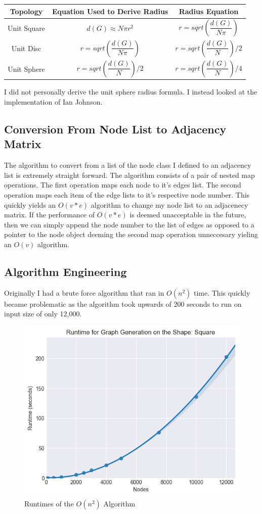 \documentclass{article}
\begin{document}
		\begin{tabular}{ |c|c|c| }
				\hline
				Topology & Equation Used to Derive Radius & Radius Equation \\
				\hline
				Unit Square & $d(G) \approx N\pi r^2 $ & $r = sqrt(\dfrac{d(G)}{N\pi})$ \\
				\hline
				Unit Disc & $r = sqrt(\dfrac{d(G)}{N\pi})$ & $r = sqrt(\dfrac{d(G)}{N})/2$ \\
				\hline
				Unit Sphere & $r = sqrt(\dfrac{d(G)}{N})/2$ & $r = sqrt(\dfrac{d(G)}{N})/4$ \\
				\hline
		\end{tabular}
    I did not personally derive the unit sphere radius formula.
    I instead looked at the implementation of Ian Johnson\cite{ianjjohnson}.
	\subsection{Conversion From Node List to Adjacency Matrix}
		The algorithm to convert from a list of the node class I defined to an adjacency list is extremely straight forward.
		The algorithm consists of a pair of nested map operations.
		The first operation maps each node to it's edges list.
		The second operation maps each item of the edge lists to it's respective node number.
		This quickly yields an $O(v*e)$ algorithm to change my node list to an adjacenecy matrix.
		If the performance of $O(v*e)$ is deemed unacceptable in the future, then we can simply append the node number to the list of edges as opposed to a pointer to the node object deeming the second map operation unneccesary yieling an $O(v)$ algorithm.


  \subsection{Algorithm Engineering}
	  Originally I had a brute force algorithm that ran in $O(n^2)$ time.
	  This quickly became problematic as the algorithm took upwards of 200 seconds to run on input size of only 12,000.
	  \begin{figure}[H]
		\centering
		\includegraphics[width=1 \textwidth]{square/runtime/runtime_chart_naive}
		\caption{Runtimes of the $O(n^2)$ Algorithm}
	  \end{figure}
\end{document}
